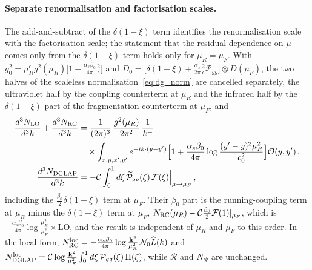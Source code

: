 \paragraph{Separate renormalisation and factorisation scales.} The add-and-subtract of the $\delta(1-\xi)$ term identifies the renormalisation scale with the factorisation scale; the statement that the residual dependence on $\mu$ comes only from the $\delta(1-\xi)$ term holds only for $\mu_R=\mu_F$. With $g_0^2=\mu_R^\epsilon g^2(\mu_R)\big[1-\frac{\alpha_s\beta_0}{4\pi}\frac2\epsilon\big]$ and $D_0=\big[\delta(1-\xi)+\frac{\alpha_s}{2\pi}\frac2\epsilon\mathcal P_{gg}\big]\otimes D(\mu_F)$, the two halves of the scaleless normalisation~\eqref{eq:dg_norm} are cancelled separately, the ultraviolet half by the coupling counterterm at $\mu_R$ and the infrared half by the $\delta(1-\xi)$ part of the fragmentation counterterm at $\mu_F$, and
\begin{align}\label{eq:dg_muRmuF}
\frac{d^3N_{\rm LO}}{d^3k}+\frac{d^3N_{\rm RC}}{d^3k}&=\frac{1}{(2\pi)^3}\,\frac{g^2(\mu_R)}{2\pi^2}\,\frac{1}{k^+}\notag\\&\quad\times\int_{x,y,x',y'}e^{-ik\cdot(y-y')}\Big[1+\frac{\alpha_s\beta_0}{4\pi}\log\frac{(y'-y)^2\mu_R^2}{c_0^2}\Big]\mathcal O(y,y')\,,\notag\\
\frac{d^3N_{\rm DGLAP}}{d^3k}&=-\mathcal C\int_0^1d\xi\,\widetilde{\mathcal P}_{gg}(\xi)\,\mathcal F(\xi)\Big|_{\mu\to\mu_F}\,,
\end{align}
including the $\frac{\beta_0}{2}\delta(1-\xi)$ term at $\mu_F$. Their $\beta_0$ part is the running-coupling term at $\mu_R$ minus the $\delta(1-\xi)$ term at $\mu_F$, $N_{\rm RC}(\mu_R)-\mathcal C\frac{\beta_0}{2}\mathcal F(1)|_{\mu_F}$, which is $+\frac{\alpha_s\beta_0}{4\pi}\log\frac{\mu_R^2}{\mu_F^2}\times$LO, and the result is independent of $\mu_R$ and $\mu_F$ to this order. In the local form, $N^{\rm loc}_{\rm RC}=-\frac{\alpha_s\beta_0}{4\pi}\log\frac{\mathbf{k}^2}{\mu_R^2}\,\mathcal N_0\widehat L(k)$ and $N^{\rm loc}_{\rm DGLAP}=\mathcal C\log\frac{\mathbf{k}^2}{\mu_F^2}\int_0^1d\xi\,\mathcal P_{gg}(\xi)\,\Pi(\xi)$, while $\mathcal R$ and $N_{\mathcal R}$ are unchanged.

